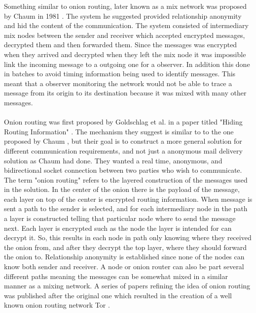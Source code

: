 \documentclass[informationsecurity]{gucmasterproject}
\begin{document}
Something similar to onion routing, later known as a mix network was proposed by Chaum in 1981 \cite{chaum1981untraceable}.
The system he suggested provided relationship anonymity and hid the content of the communication. The system consisted of intermediary mix nodes between the sender and receiver which accepted encrypted messages, decrypted them and then forwarded them. Since the messages was encrypted when they arrived and decrypted when they left the mix node it was impossible link the incoming message to a outgoing one for a observer. In addition this done in batches to avoid timing information being used to identify messages. This meant that a observer monitoring the network would not be able to trace a message from its origin to its destination because it was mixed with many other messages.

\paragraph{}
Onion routing was first proposed by Goldschlag et al. in a paper titled "Hiding Routing Information" \cite{goldschlag1996hiding}.
The mechanism they suggest is similar to to the one proposed by Chaum \cite{chaum1981untraceable}, but their goal is to construct a more general solution for different communication requirements, and not just a anonymous mail delivery solution as Chaum had done. They wanted a real time, anonymous, and bidirectional socket connection between two parties who wish to communicate. The term "onion routing" refers to the layered construction of the messages used in the solution. In the center of the onion there is the payload of the message, each layer on top of the center is encrypted routing information. When message is sent a path to the sender is selected, and for each intermediary node in the path a layer is constructed telling that particular node where to send the message next. Each layer is encrypted such as the node the layer is intended for can decrypt it. So, this results in each node in path only knowing where they received the onion from, and after they decrypt the top layer, where they should forward the onion to. Relationship anonymity is established since none of the nodes can know both sender and receiver. A node or onion router can also be part several different paths meaning the messages can be somewhat mixed in a similar manner as a mixing network.
A series of papers refining the idea of onion routing was published after the original one which resulted in the creation of a well known onion routing network Tor \cite{reed1998anonymous}\cite{goldschlag1999onion}\cite{dingledine2004tor}.
\end{document}
